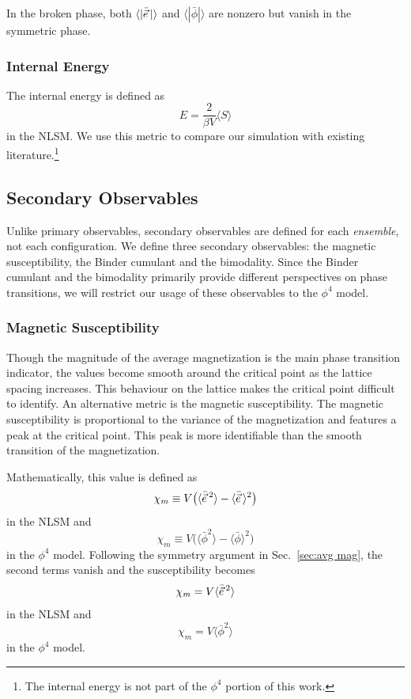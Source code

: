 In the broken phase, both $\langle |\bar{\vec e}\, |\rangle$ and $\langle |\bar\phi| \rangle$ are nonzero but vanish in the symmetric phase.

\subsubsection{Internal Energy}
The internal energy is defined as \cite{berg1981}
\begin{equation}
    E = \frac{2}{\beta V} \langle S \rangle
\end{equation}
in the NLSM. We use this metric to compare our simulation with existing literature.\footnote{The internal energy is not part of the $\phi^4$ portion of this work.}

\subsection{Secondary Observables}
Unlike primary observables, secondary observables are defined for each \textit{ensemble}, not each configuration. We define three secondary observables: the magnetic susceptibility, the Binder cumulant and the bimodality. Since the Binder cumulant and the bimodality primarily provide different perspectives on phase transitions, we will restrict our usage of these observables to the $\phi^4$ model.

\subsubsection{Magnetic Susceptibility}
Though the magnitude of the average magnetization is the main phase transition indicator, the values become smooth around the critical point as the lattice spacing increases. This behaviour on the lattice makes the critical point difficult to identify. An alternative metric is the magnetic susceptibility. The magnetic susceptibility is proportional to the variance of the magnetization and features a peak at the critical point. This peak is more identifiable than the smooth transition of the magnetization. 

Mathematically, this value is defined as 
\begin{equation}
\chi_m \equiv V \big(\langle {\bar{\vec e}}\,^2 \rangle - \langle \bar{\vec e}\, \rangle^2\big)
\end{equation}
in the NLSM and
\begin{equation}
    \chi_m \equiv V \big(\langle {\bar\phi}^2 \rangle - \langle \bar\phi \rangle^2\big)
\end{equation}
in the $\phi^4$ model. Following the symmetry argument in Sec.~\ref{sec:avg mag}, the second terms vanish and the susceptibility becomes 
\begin{equation}
    \label{eq:chim phi4}
\chi_m = V \langle {\bar{\vec e}}\,^2 \rangle 
\end{equation}
in the NLSM and
\begin{equation}
    \label{eq:chim nlsm}
    \chi_m = V \langle {\bar\phi^2} \rangle
\end{equation}
in the $\phi^4$ model.

